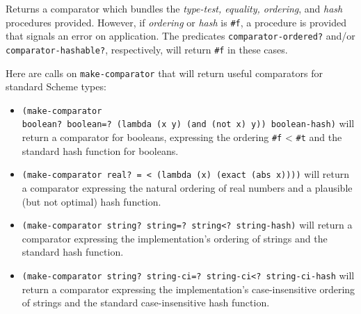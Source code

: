 \begin{entry}{%
  }

  Returns a comparator which bundles the \emph{type-test, equality,
    ordering}, and \emph{hash} procedures provided. However, if
  \emph{ordering} or \emph{hash} is \texttt{\#f}, a procedure is
  provided that signals an error on application. The predicates
  \texttt{comparator-ordered?} and/or \texttt{comparator-hashable?},
  respectively, will return \texttt{\#f} in these cases.

  Here are calls on \texttt{make-comparator} that will return useful
  comparators for standard Scheme types:

  \begin{itemize}
  \item \texttt{(make-comparator boolean?\ boolean=?\ (lambda\ (x\
      y)\ (and\ (not\ x)\ y))\ boolean-hash)} will return a comparator
    for booleans, expressing the ordering \texttt{\#f} < \texttt{\#t}
    and the standard hash function for booleans.
  \item \texttt{(make-comparator\ real?\ =\ <\ (lambda\ (x)\ (exact\
      (abs\ x))))} will return a comparator expressing the natural
    ordering of real numbers and a plausible (but not optimal) hash
    function.
  \item \texttt{(make-comparator\ string?\ string=?\ string<?\
      string-hash)} will return a comparator expressing the
    implementation's ordering of strings and the standard hash
    function.
  \item \texttt{(make-comparator\ string?\ string-ci=?\ string-ci<?\
      string-ci-hash} will return a comparator expressing the
    implementation's case-insensitive ordering of strings and the
    standard case-insensitive hash function.
  \end{itemize}
\end{entry}

